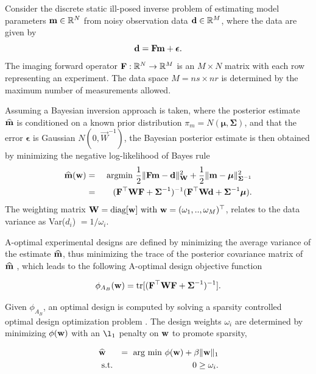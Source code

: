\documentclass[12pt]{article}
\newcommand{\bfF}	{{\bf{F}}}
\newcommand{\bfW}	{{\bf{W}}}
\newcommand{\bfd}	{{\bf{d}}}
\newcommand{\bfm}	{{\bf{m}}}
\newcommand{\bfw}	{{\bf{w}}}
\newcommand{\W}		{\vec{W}}
\newcommand{\hf}        {{\frac 12}}
\newcommand{\bfepsilon} {{\boldsymbol \epsilon}}
\newcommand{\bfSigma}   {{\boldsymbol \Sigma}}
\newcommand{\bfmu}      {{\boldsymbol \mu}}
\newcommand{\bfmhat}    {{\widehat{\bfm}}}
\renewcommand{\hf}		 {\frac12}
\renewcommand{\bfmhat}	{\widehat{\bf m}}
\begin{document}
Consider the discrete static  ill-posed inverse problem of estimating  model parameters $\bfm \in \mathbb{R}^{N}$ from noisy observation data $\bfd \in \mathbb{R}^{M}$, where the data are given by 
\begin{equation*}
\bfd = \bfF \bfm + {\bfepsilon}.
\end{equation*} 
The imaging forward operator  $\bfF: \mathbb{R}^{N} \rightarrow \mathbb{R}^{M}$ is an $M \times N$ matrix with each row representing an experiment.  The data space $ M = ns \times nr$ is determined by the maximum  number of measurements allowed. 
 
Assuming a Bayesian inversion approach is taken, where the posterior estimate  $\bfmhat$ is conditioned on a known prior distribution $\pi_m = N({\bfmu},\bfSigma)$, and that the error ${\bfepsilon}$ is Gaussian $N(0,\W^{-1})$, the Bayesian posterior estimate is then obtained by minimizing the negative log-likelihood of Bayes rule 
\begin{eqnarray*}
\bfmhat(\bfw) &=& \text{ argmin } \hf\| \bfF \bfm- \bfd\|^2_{ \bfW} + \hf \|\bfm-{\bfmu}\|^2_{\bfSigma^{-1}}\\
 &=& (\bfF^{\top} \bfW \bfF + \bfSigma^{-1})^{-1}(\bfF^{\top} \bfW \bfd + \bfSigma^{-1}{\bfmu}).
\end{eqnarray*}     
 The weighting matrix $\bfW = \text{diag}[\bfw] \text{ with } \bfw = (\omega_1,..,\omega_M)^{\top}$, relates to the data variance as Var($d_{i}$) $=1/\omega_i$. 
 
\bigskip


A-optimal experimental designs  are defined by  minimizing the average variance of the estimate $\bfmhat$, thus minimizing the trace of the posterior covariance matrix of $\bfmhat$ \cite{Atkinson1992}, which leads to the following A-optimal design objective function
  
  \begin{equation}
  \label{AB}
  \phi_{A_B}(\bfw) = \text{tr}[(\bfF^{\top} \bfW \bfF + \bfSigma^{-1})^{-1}].
  \end{equation}


Given $\phi_{A_B}$, an optimal design is  computed by solving a sparsity controlled optimal design optimization problem \cite{Haber2008}. The design weights $\omega_i$ are determined  by minimizing  $\phi(\bfw)$ with an $\l_1$ penalty on  $\bfw$ to promote sparsity,


\begin{eqnarray}
\label{design}
&\widehat{\bfw}& = \text{ arg min } \phi(\bfw) + \beta\|\bfw\|_1\\
\nonumber
 &\text{ s.t.}& 0 \geq \omega_i.
\end{eqnarray}
\end{document}
